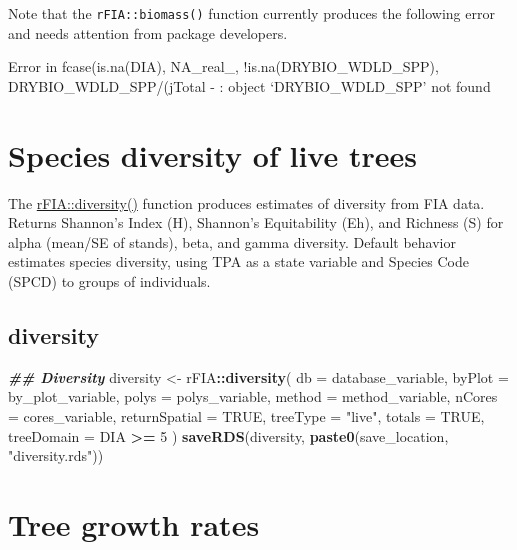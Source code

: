 \documentclass[
]{book}
\newenvironment{Shaded}{\begin{snugshade}}{\end{snugshade}}
\newcommand{\AttributeTok}[1]{\textcolor[rgb]{0.13,0.29,0.53}{#1}}
\newcommand{\ConstantTok}[1]{\textcolor[rgb]{0.56,0.35,0.01}{#1}}
\newcommand{\DecValTok}[1]{\textcolor[rgb]{0.00,0.00,0.81}{#1}}
\newcommand{\DocumentationTok}[1]{\textcolor[rgb]{0.56,0.35,0.01}{\textbf{\textit{#1}}}}
\newcommand{\FunctionTok}[1]{\textcolor[rgb]{0.13,0.29,0.53}{\textbf{#1}}}
\newcommand{\NormalTok}[1]{#1}
\newcommand{\OtherTok}[1]{\textcolor[rgb]{0.56,0.35,0.01}{#1}}
\newcommand{\SpecialCharTok}[1]{\textcolor[rgb]{0.81,0.36,0.00}{\textbf{#1}}}
\newcommand{\StringTok}[1]{\textcolor[rgb]{0.31,0.60,0.02}{#1}}
\begin{document}
Note that the \texttt{rFIA::biomass()} function currently produces the following error and needs attention from package developers.

Error in fcase(is.na(DIA), NA\_real\_, !is.na(DRYBIO\_WDLD\_SPP), DRYBIO\_WDLD\_SPP/(jTotal - : object `DRYBIO\_WDLD\_SPP' not found

\hypertarget{species-diversity-of-live-trees}{%
\section{Species diversity of live trees}\label{species-diversity-of-live-trees}}

The \href{https://rdrr.io/cran/rFIA/man/diversity.html}{rFIA::diversity()} function produces estimates of diversity from FIA data. Returns Shannon's Index (H), Shannon's Equitability (Eh), and Richness (S) for alpha (mean/SE of stands), beta, and gamma diversity. Default behavior estimates species diversity, using TPA as a state variable and Species Code (SPCD) to groups of individuals.

\hypertarget{diversity}{%
\subsection{diversity}\label{diversity}}

\begin{Shaded}
\begin{Highlighting}[]
\DocumentationTok{\#\# Diversity}
\NormalTok{diversity }\OtherTok{\textless{}{-}}\NormalTok{ rFIA}\SpecialCharTok{::}\FunctionTok{diversity}\NormalTok{(}
  \AttributeTok{db =}\NormalTok{ database\_variable,}
  \AttributeTok{byPlot =}\NormalTok{ by\_plot\_variable,}
  \AttributeTok{polys =}\NormalTok{ polys\_variable,}
  \AttributeTok{method =}\NormalTok{ method\_variable,}
  \AttributeTok{nCores =}\NormalTok{ cores\_variable,}
  \AttributeTok{returnSpatial =} \ConstantTok{TRUE}\NormalTok{,}
  \AttributeTok{treeType =} \StringTok{"live"}\NormalTok{,}
  \AttributeTok{totals =} \ConstantTok{TRUE}\NormalTok{,}
  \AttributeTok{treeDomain =}\NormalTok{ DIA }\SpecialCharTok{\textgreater{}=} \DecValTok{5}
\NormalTok{)}
\FunctionTok{saveRDS}\NormalTok{(diversity, }\FunctionTok{paste0}\NormalTok{(save\_location, }\StringTok{"diversity.rds"}\NormalTok{))}
\end{Highlighting}
\end{Shaded}

\hypertarget{tree-growth-rates}{%
\section{Tree growth rates}\label{tree-growth-rates}}
\end{document}
